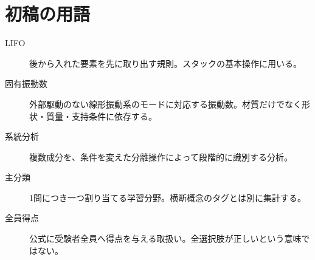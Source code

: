 \chapter{初稿の用語}
\begin{description}
\item[LIFO] 後から入れた要素を先に取り出す規則。スタックの基本操作に用いる。
\item[固有振動数] 外部駆動のない線形振動系のモードに対応する振動数。材質だけでなく形状・質量・支持条件に依存する。
\item[系統分析] 複数成分を、条件を変えた分離操作によって段階的に識別する分析。
\item[主分類] 1問につき一つ割り当てる学習分野。横断概念のタグとは別に集計する。
\item[全員得点] 公式に受験者全員へ得点を与える取扱い。全選択肢が正しいという意味ではない。
\end{description}
